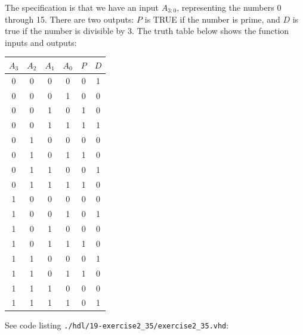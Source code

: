 \documentclass[12pt]{article}
\newenvironment{sol}[1][Solution]{\begin{trivlist}
		\item[\hskip \labelsep {\bfseries #1:}]}{\end{trivlist}}
\begin{document}
\begin{sol}
	The specification is that we have an input $A_{3:0}$, representing the numbers 0 through 15.
	There are two outputs: $P$ is TRUE if the number is prime, and $D$ is true if the number is
	divisible by 3. The truth table below shows the function inputs and outputs:
	\begin{center}
		\begin{tabular}{cccc|cc}
			$A_3$ & $A_2$ & $A_1$ & $A_0$ & $P$ & $D$\\
			\hline
			0 & 0 & 0 & 0 & 0 & 1\\
			0 & 0 & 0 & 1 & 0 & 0\\
			0 & 0 & 1 & 0 & 1 & 0\\
			0 & 0 & 1 & 1 & 1 & 1\\
			0 & 1 & 0 & 0 & 0 & 0\\
			0 & 1 & 0 & 1 & 1 & 0\\
			0 & 1 & 1 & 0 & 0 & 1\\
			0 & 1 & 1 & 1 & 1 & 0\\
			1 & 0 & 0 & 0 & 0 & 0\\ %
			1 & 0 & 0 & 1 & 0 & 1\\ %
			1 & 0 & 1 & 0 & 0 & 0\\ %
			1 & 0 & 1 & 1 & 1 & 0\\ %
			1 & 1 & 0 & 0 & 0 & 1\\ %
			1 & 1 & 0 & 1 & 1 & 0\\ %
			1 & 1 & 1 & 0 & 0 & 0\\ %
			1 & 1 & 1 & 1 & 0 & 1\\ %
		\end{tabular}
	\end{center}
	
	See code listing \texttt{./hdl/19-exercise2\_35/exercise2\_35.vhd}:
	
\end{sol}
\end{document}
